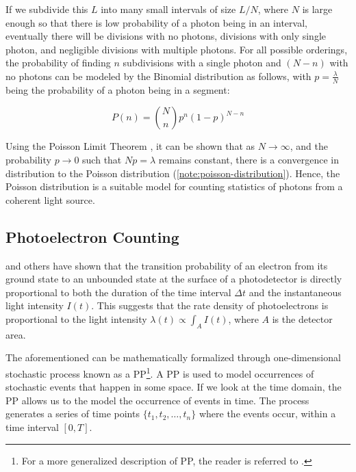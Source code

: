 If we subdivide this $L$ into many small intervals  of size $L/N$, where $N$ is large enough so that there is low probability of a photon being in an interval, eventually there will be divisions with no photons, divisions with only single photon, and negligible divisions with multiple photons. For all possible orderings, the probability of finding $n$ subdivisions with a single photon and $(N-n)$ with no photons can be modeled by the Binomial distribution as follows, with $p=\frac{\lambda}{N}$ being the probability of a photon being in a segment:

\begin{equation}
    P(n) = \binom{N}{n} p^n (1 - p)^{N - n}
\end{equation}

Using the Poisson Limit Theorem \cite{fellerIntroductionProbabilityTheory1968}, it can be shown that as $N \to \infty$, and the probability $p \to 0$ such that $Np = \lambda$ remains constant, there is a convergence in distribution to the Poisson distribution (\cref{note:poisson-distribution}). Hence, the Poisson distribution is a suitable model for counting statistics of photons from a coherent light source.

\subsection{Photoelectron Counting}
\citeauthor{mandelFluctuationsPhotonBeams1958} \cite{mandelFluctuationsPhotonBeams1958,mandelFluctuationsPhotonBeams1959} and others have shown that the transition probability of an electron from its ground state to an unbounded state at the surface of a photodetector is directly proportional to both the duration of the time interval $\Delta t$ and the instantaneous light intensity $I(t)$. This suggests that the rate density of photoelectrons is proportional to the light intensity $\lambda(t) \propto \int_{A} I(t)$, where $A$ is the detector area.

The aforementioned can be mathematically formalized through one-dimensional stochastic process known as a \gls{PP}\footnote{For a more generalized description of \gls{PP}, the reader is referred to \cite{chiuStochasticGeometryIts2013}.}. A \gls{PP} is used to model occurrences of stochastic events that happen in some space. If we look at the time domain, the \gls{PP} allows us to the model the occurrence of events in time. The process generates a series of time points $\{t_1, t_2, \dots, t_n\}$ where the events occur, within a time interval $[0, T]$.

